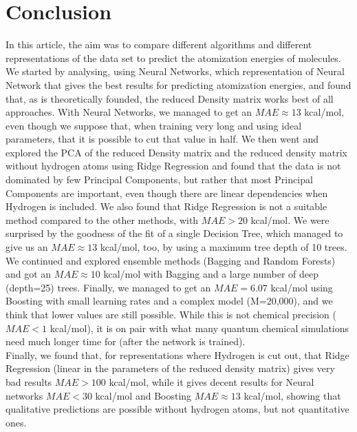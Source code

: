 \documentclass[11pt,a4paper,notitlepage]{article}
\begin{document}
\section{Conclusion}
In this article, the aim was to compare different algorithms and different representations of the data set to predict the atomization energies of molecules. We started by analysing, using Neural Networks, which representation of Neural Network that gives the best results for predicting atomization energies, and found that, as is theoretically founded, the reduced Density matrix works best of all approaches. With Neural Networks, we managed to get an $MAE \approx 13$ kcal/mol, even though we suppose that, when training very long and using ideal parameters, that it is possible to cut that value in half. We then went and explored the PCA of the reduced Density matrix and the reduced density matrix without hydrogen atoms using Ridge Regression and found that the data is not dominated by few Principal Components, but rather that most Principal Components are important, even though there are linear dependencies when Hydrogen is included. We also found that Ridge Regression is not a suitable method compared to the other methods, with  $MAE>20$ kcal/mol. We were surprised by the goodness of the fit of a single Decision Tree, which managed to give us an  $MAE \approx 13$ kcal/mol, too, by using a maximum tree depth of 10 trees. We continued and explored ensemble methods (Bagging and Random Forests) and got an $MAE \approx 10$ kcal/mol with Bagging and a large number of deep (depth=25) trees. Finally, we managed to get an $MAE = 6.07$ kcal/mol using Boosting with small learning rates and a complex model (M=20,000), and we think that lower values are still possible. While this is not chemical precision ($MAE < 1$ kcal/mol), it is on pair with what many quantum chemical simulations need much longer time for (after the network is trained). \\ Finally, we found that, for representations where Hydrogen is cut out, that Ridge Regression (linear in the parameters of the reduced density matrix) gives very bad results $MAE > 100$ kcal/mol, while it gives decent results for Neural networks  $MAE < 30$ kcal/mol and Boosting  $MAE \approx 13$ kcal/mol, showing that qualitative predictions are possible without hydrogen atoms, but not quantitative ones. \\
\end{document}
